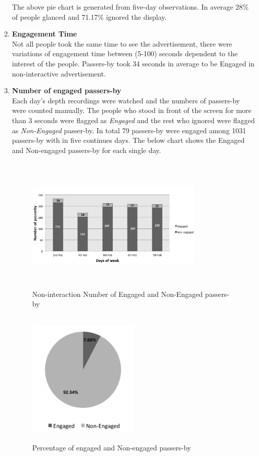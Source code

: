 \begin{enumerate}
The above pie chart is generated from five-day observations. In average 28\% of people glanced and 71.17\% ignored the display. 

\item \textbf{Engagement Time} \\
Not all people took the same time to see the advertisement, there were variations of engagement time between (5-100) seconds dependent to the interest of the people. Passers-by took 34 seconds in average to be Engaged in non-interactive advertisement.


\item \textbf{Number of engaged passers-by} \\
Each day’s depth recordings were watched and the numbers of passers-by were counted manually. The people who stood in front of the screen for more than 3 seconds were flagged as \emph{Engaged} and the rest who ignored were flagged as \emph{Non-Engaged} passer-by. In total 79 passers-by were engaged among 1031 passers-by with in five continues days. The below chart shows the Engaged and Non-engaged passers-by for each single day.


\begin{figure}[H]
    \centering
    \includegraphics[width=0.8\textwidth,height=6.5cm]{Figures/8/non_inter_findings/non_inter_engage_day}
    \caption{Non-interaction Number of Engaged and Non-Engaged passers-by}%
    \label{fig:Nonengagedandengagedby}%
\end{figure}

\begin{figure}[H]
    \centering
    \includegraphics[width=0.5\textwidth,height=6.5cm]{Figures/8/non_inter_findings/non_eng_percentage}
    \caption{Percentage of engaged and Non-engaged passers-by}%
    \label{fig:Nonengagedpasserbypercentage}%
\end{figure}



\end{enumerate}
